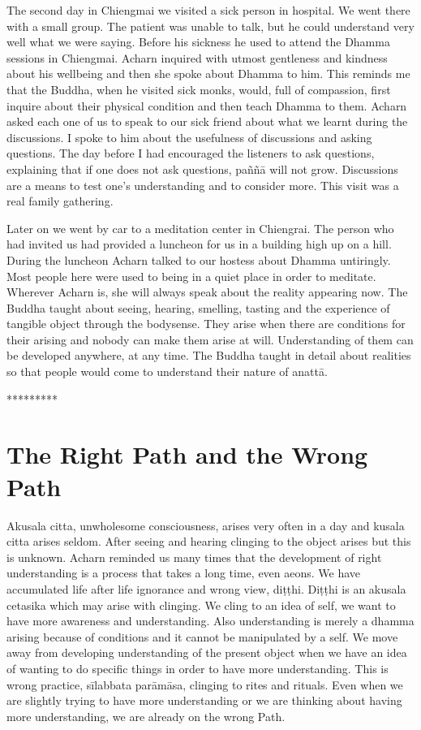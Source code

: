 {{{{{{{The second day in Chiengmai we visited
a sick person in hospital. We went there with a small group. The patient
was unable to talk, but he could understand very well what we were
saying. Before his sickness he used to attend the Dhamma sessions in
Chiengmai. Acharn inquired with utmost gentleness and kindness about his
wellbeing and then she spoke about Dhamma to him. This reminds me that
the Buddha, when he visited sick monks, would, full of compassion, first
inquire about their physical condition and then teach Dhamma to them.
Acharn asked each one of us to speak to our sick friend about what we
learnt during the discussions. I spoke to him about the usefulness of
discussions and asking questions. The day before I had encouraged the
listeners to ask questions, explaining that if one does not ask
questions, paññā will not grow. Discussions are a means to test one's
understanding and to consider more. This visit was a real family
gathering.

Later on we went by car to a meditation
center in Chiengrai. The person who had invited us had provided a
luncheon for us in a building high up on a hill. During the luncheon
Acharn talked to our hostess about Dhamma untiringly. Most people here
were used to being in a quiet place in order to meditate. Wherever
Acharn is, she will always speak about the reality appearing now. The
Buddha taught about seeing, hearing, smelling, tasting and the
experience of tangible object through the bodysense. They arise when
there are conditions for their arising and nobody can make them arise at
will. Understanding of them can be developed anywhere, at any time. The
Buddha taught in detail about realities so that people would come to
understand their nature of anattā. 

*********



\chapter{The Right Path and the Wrong Path} 

Akusala citta, unwholesome
consciousness, arises very often in a day and kusala citta arises
seldom. After seeing and hearing clinging to the object arises but this
is unknown. Acharn reminded us many times that the development of right
understanding is a process that takes a long time, even aeons. We have
accumulated life after life ignorance and wrong view, diṭṭhi. Diṭṭhi is
an akusala cetasika which may arise with clinging. We cling to an idea
of self, we want to have more awareness and understanding. Also
understanding is merely a dhamma arising because of conditions and it
cannot be manipulated by a self. We move away from developing
understanding of the present object when we have an idea of wanting to
do specific things in order to have more understanding. This is wrong
practice, sīlabbata parāmāsa, clinging to rites and rituals. Even when
we are slightly trying to have more understanding or we are thinking
about having more understanding, we are already on the wrong Path. 

}}}}}}}
